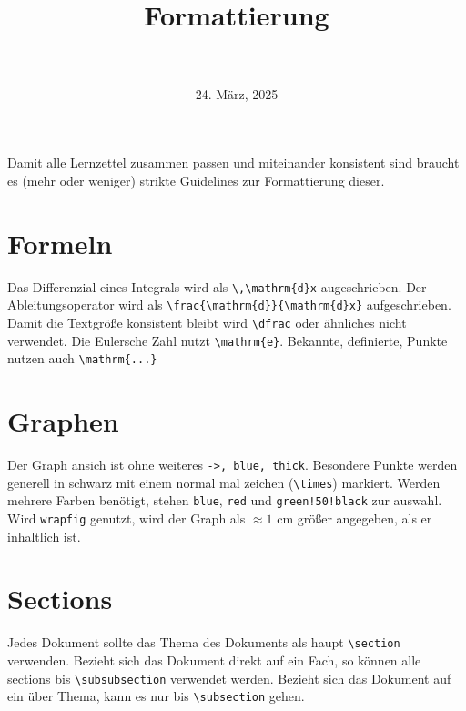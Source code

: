 \documentclass{article}
\title{
 \LARGE{\textls[200]{Guidelines}} \\
 \normalsize{\textls[250]{für die}} \\ [-0.7em]
 \LARGE{Formattierung} \\
 \normalsize{\textls[250]{der}} \\ [-0.7em]
 \LARGE{\textls[200]{Lernzettel}} 
}
\date{24. März, 2025}
\begin{document}
 
\maketitle
 
\noindent Damit alle Lernzettel zusammen passen und miteinander konsistent sind braucht es (mehr oder weniger) strikte Guidelines zur Formattierung dieser.
 
\section{Formeln}
Das Differenzial eines Integrals wird als \verb|\,\mathrm{d}x| augeschrieben. Der Ableitungsoperator wird als \verb|\frac{\mathrm{d}}{\mathrm{d}x}| aufgeschrieben. \newline
Damit die Textgröße konsistent bleibt wird \verb|\dfrac| oder ähnliches nicht verwendet. \newline
Die Eulersche Zahl nutzt \verb|\mathrm{e}|. Bekannte, definierte, Punkte nutzen auch \verb|\mathrm{...}|
 
\section{Graphen}
Der Graph ansich ist ohne weiteres \verb|->, blue, thick|. Besondere Punkte werden generell in schwarz mit einem normal mal zeichen (\verb|\times|) markiert. Werden mehrere Farben benötigt, stehen \verb|blue|, \verb|red| und \verb|green!50!black| zur auswahl. \newline
Wird \verb|wrapfig| genutzt, wird der Graph als $\approx 1$ cm größer angegeben, als er inhaltlich ist. 
 
\section{Sections}
Jedes Dokument sollte das Thema des Dokuments als haupt \verb|\section| verwenden. Bezieht sich das Dokument direkt auf ein Fach, so können alle sections bis \verb|\subsubsection| verwendet werden. Bezieht sich das Dokument auf ein über Thema, kann es nur bis \verb|\subsection| gehen.
 
\end{document}
